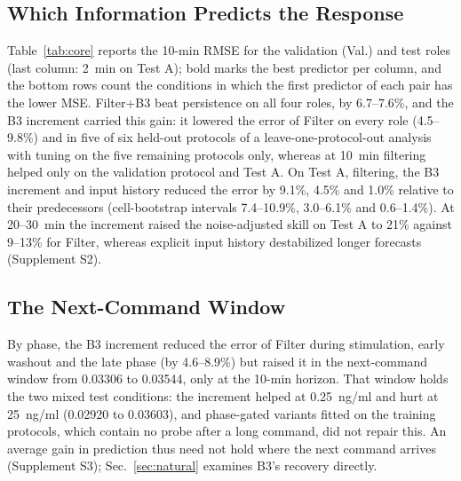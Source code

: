 \documentclass[conference]{IEEEtran}
\newcommand{\pr}[1]{\textsf{#1}}
\begin{document}
\subsection{Which Information Predicts the Response}
\label{sec:forecast}
Table~\ref{tab:core} reports the 10-min RMSE for the validation (Val.) and test roles (last column: 2~min on Test A); bold marks the best predictor per column, and the bottom rows count the conditions in which the first predictor of each pair has the lower MSE. \pr{Filter+B3} beat persistence on all four roles, by 6.7--7.6\%, and the B3 increment carried this gain: it lowered the error of \pr{Filter} on every role (4.5--9.8\%) and in five of six held-out protocols of a leave-one-protocol-out analysis with tuning on the five remaining protocols only, whereas at 10~min filtering helped only on the validation protocol and Test A. On Test A, filtering, the B3 increment and input history reduced the error by 9.1\%, 4.5\% and 1.0\% relative to their predecessors (cell-bootstrap intervals 7.4--10.9\%, 3.0--6.1\% and 0.6--1.4\%). At 20--30~min the increment raised the noise-adjusted skill on Test A to 21\% against 9--13\% for \pr{Filter}, whereas explicit input history destabilized longer forecasts (Supplement S2).

\subsection{The Next-Command Window}
\label{sec:nextcmd}
By phase, the B3 increment reduced the error of \pr{Filter} during stimulation, early washout and the late phase (by 4.6--8.9\%) but raised it in the next-command window from 0.03306 to 0.03544, only at the 10-min horizon. That window holds the two mixed test conditions: the increment helped at 0.25~ng/ml and hurt at 25~ng/ml (0.02920 to 0.03603), and phase-gated variants fitted on the training protocols, which contain no probe after a long command, did not repair this. An average gain in prediction thus need not hold where the next command arrives (Supplement S3); Sec.~\ref{sec:natural} examines B3's recovery directly.

\begin{table}[t]
\caption{Certified waiting on held-out simulated receivers (B3, noise s.d.\ 0.005). $S_m$: test success (\%) after the $m$-min command, one-sided 95\% lower bound in parentheses; $T$: mean completion (min); $\Delta T$: paired difference to the fixed waits with 95\% bootstrap interval (primary split); Met: splits (of 20) with $S_3,S_{30}\geq90\%$, in parentheses those certified for both histories.}
\label{tab:waiting}
\centering\footnotesize\setlength{\tabcolsep}{1.6pt}

\end{table}
\end{document}
